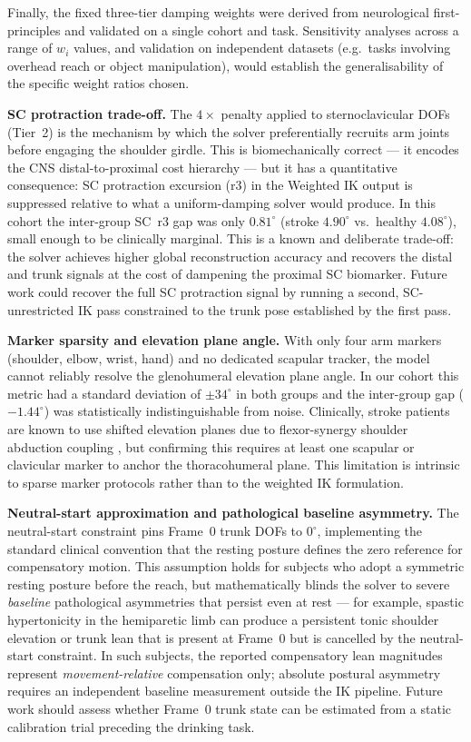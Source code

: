 \documentclass[journal,10pt,twocolumn]{IEEEtran}
\begin{document}
Finally, the fixed three-tier damping weights were derived from
neurological first-principles and validated on a single cohort and task.
Sensitivity analyses across a range of $w_i$ values, and validation on
independent datasets (e.g.\ tasks involving overhead reach or object
manipulation), would establish the generalisability of the specific
weight ratios chosen.

\textbf{SC protraction trade-off.}
The $4\times$ penalty applied to sternoclavicular DOFs (Tier~2) is the
mechanism by which the solver preferentially recruits arm joints before
engaging the shoulder girdle.
This is biomechanically correct --- it encodes the CNS distal-to-proximal
cost hierarchy --- but it has a quantitative consequence: SC protraction
excursion (r3) in the Weighted IK output is suppressed relative to what
a uniform-damping solver would produce.
In this cohort the inter-group SC~r3 gap was only $0.81^{\circ}$
(stroke $4.90^{\circ}$ vs.\ healthy $4.08^{\circ}$), small enough to be
clinically marginal.
This is a known and deliberate trade-off: the solver achieves higher
global reconstruction accuracy and recovers the distal and trunk signals
at the cost of dampening the proximal SC biomarker.
Future work could recover the full SC protraction signal by running a
second, SC-unrestricted IK pass constrained to the trunk pose established
by the first pass.

\textbf{Marker sparsity and elevation plane angle.}
With only four arm markers (shoulder, elbow, wrist, hand) and no
dedicated scapular tracker, the model cannot reliably resolve the
glenohumeral elevation plane angle.
In our cohort this metric had a standard deviation of $\pm34^{\circ}$
in both groups and the inter-group gap ($-1.44^{\circ}$) was
statistically indistinguishable from noise.
Clinically, stroke patients are known to use shifted elevation planes due
to flexor-synergy shoulder abduction coupling \cite{dewald1995}, but
confirming this requires at least one scapular or clavicular marker to
anchor the thoracohumeral plane.
This limitation is intrinsic to sparse marker protocols rather than to
the weighted IK formulation.

\textbf{Neutral-start approximation and pathological baseline asymmetry.}
The neutral-start constraint pins Frame~0 trunk DOFs to $0^{\circ}$,
implementing the standard clinical convention that the resting posture
defines the zero reference for compensatory motion.
This assumption holds for subjects who adopt a symmetric resting posture
before the reach, but mathematically blinds the solver to severe
\emph{baseline} pathological asymmetries that persist even at rest ---
for example, spastic hypertonicity in the hemiparetic limb can produce
a persistent tonic shoulder elevation or trunk lean that is present at
Frame~0 but is cancelled by the neutral-start constraint.
In such subjects, the reported compensatory lean magnitudes represent
\emph{movement-relative} compensation only; absolute postural asymmetry
requires an independent baseline measurement outside the IK pipeline.
Future work should assess whether Frame~0 trunk state can be estimated
from a static calibration trial preceding the drinking task.
\end{document}

